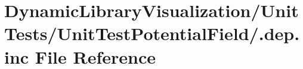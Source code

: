 \hypertarget{_unit_tests_2_unit_test_potential_field_2_8dep_8inc}{}\section{Dynamic\+Library\+Visualization/\+Unit\+Tests/\+Unit\+Test\+Potential\+Field/.dep.\+inc File Reference}
\label{_unit_tests_2_unit_test_potential_field_2_8dep_8inc}
